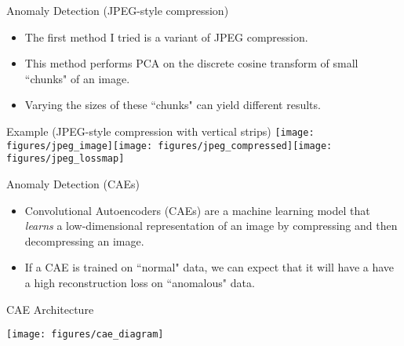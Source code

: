 \documentclass[10pt]{beamer}
\begin{document}
\begin{frame}{Anomaly Detection (JPEG-style compression)}

\begin{itemize}

\item The first method I tried is a variant of JPEG compression.

\item This method performs PCA on the discrete cosine transform of small ``chunks" of an image.

\item Varying the sizes of these ``chunks" can yield different results.\\[1cm]

\end{itemize}
\pause

\begin{exampleblock}{Example (JPEG-style compression with vertical strips)}
\texttt{[image: figures/jpeg\_image]}\texttt{[image: figures/jpeg\_compressed]}\texttt{[image: figures/jpeg\_lossmap]}
\end{exampleblock}

\end{frame}

\begin{frame}{Anomaly Detection (CAEs)}

\begin{itemize}
\item Convolutional Autoencoders (CAEs) are a machine learning model that \textit{learns} a low-dimensional representation of an image by compressing and then decompressing an image.

\item If a CAE is trained on ``normal" data, we can expect that it will have a have a high reconstruction loss on ``anomalous" data.\\[1cm]
\end{itemize}

\begin{exampleblock}{CAE Architecture}
\begin{center}
\texttt{[image: figures/cae\_diagram]}
\end{center}
\end{exampleblock}

\end{frame}
\end{document}
